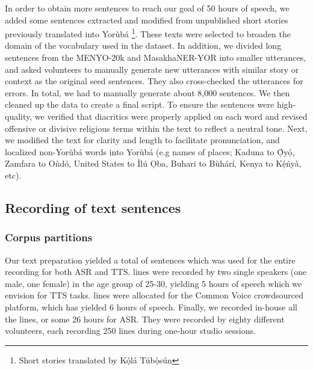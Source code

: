 \documentclass{article}
\newcommand{\Yoruba}{Yor\`{u}b\'{a} }
\begin{document}
In order to obtain more sentences to reach our goal of 50 hours of speech, we added some sentences extracted and modified from unpublished short stories previously translated into \Yoruba{}\footnote{Short stories translated by K\d{\'{o}}l\'{a} T\'{u}b\d{\`{o}}s\'{u}n}. These texts were selected to broaden the domain of the vocabulary used in the dataset. In addition, we divided long sentences from the MENYO-20k and MasakhaNER-YOR into smaller utterances, and asked volunteers to manually generate new utterances with similar story or context as the original seed sentences. They also cross-checked the utterances for errors. In total, we had to manually generate about 8,000 sentences.
We then cleaned up the data to create a final script. To ensure the sentences were high-quality, we verified that diacritics were properly applied on each word and revised offensive or divisive religious terms within the text to reflect a neutral tone. Next, we modified the text for clarity and length to facilitate pronunciation, and localized non-Yor\`{u}b\'{a} words into \Yoruba{} (e.g names of places; Kaduna to \d{\`{O}}y\d{\'{o}}, Zamfara to O\`{n}d\'{o}, United States to \`{I}l\'{u} \d{O}ba, Buhari to B\`{u}h\'{a}r\'{i}, Kenya to K\d{\'{e}}\'{n}y\`{a}, etc).



\subsection{Recording of text sentences}
\subsubsection{Corpus partitions}
Our text preparation yielded a total of %
 sentences which was used for the entire recording for both ASR and TTS. %
 lines were recorded by two single speakers (one male, one female) in the age group of 25-30, yielding 5 hours of speech which we envision for TTS tasks. %
 lines were allocated for the Common Voice crowdsourced platform, which has yielded 6 hours of speech. Finally, we recorded in-house all the  lines, or some 26 hours for ASR. %
They were recorded by eighty different volunteers, each recording 250 lines during one-hour studio sessions. 
\end{document}

